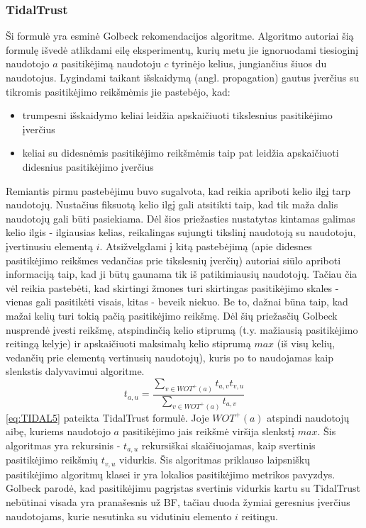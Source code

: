 \documentclass{VUMIFInfMagistrinis}
\begin{document}
\subsubsection{TidalTrust}
Ši formulė yra esminė Golbeck rekomendacijos algoritme. Algoritmo autoriai šią formulę išvedė atlikdami eilę eksperimentų, kurių metu jie ignoruodami tiesioginį naudotojo $a$ pasitikėjimą naudotoju $c$ tyrinėjo kelius, jungiančius šiuos du naudotojus. Lygindami taikant išskaidymą (angl. propagation) gautus įverčius su tikromis pasitikėjimo reikšmėmis jie pastebėjo, kad: 
\begin{itemize}
	\item trumpesni išskaidymo keliai leidžia apskaičiuoti tikslesnius pasitikėjimo įverčius
	\item keliai su didesnėmis pasitikėjimo reikšmėmis taip pat leidžia apskaičiuoti didesnius pasitikėjimo įverčius
\end{itemize}
Remiantis pirmu pastebėjimu buvo sugalvota, kad reikia apriboti kelio ilgį tarp naudotojų. Nustačius fiksuotą kelio ilgį gali atsitikti taip, kad tik maža dalis naudotojų gali būti pasiekiama. Dėl šios priežasties nustatytas kintamas galimas kelio ilgis - ilgiausias kelias, reikalingas sujungti tikslinį naudotoją su naudotoju, įvertinusiu elementą $i$.
\newline
\indent
Atsižvelgdami į kitą pastebėjimą (apie didesnes pasitikėjimo reikšmes vedančias prie tikslesnių įverčių) autoriai siūlo apriboti informaciją taip, kad ji būtų gaunama tik iš patikimiausių naudotojų. Tačiau čia vėl reikia pastebėti, kad skirtingi žmones turi skirtingas pasitikėjimo skales - vienas gali pasitikėti visais, kitas - beveik niekuo. Be to, dažnai būna taip, kad mažai kelių turi tokią pačią pasitikėjimo reikšmę. Dėl šių priežasčių Golbeck nusprendė įvesti reikšmę, atspindinčią kelio stiprumą (t.y. mažiausią pasitikėjimo reitingą kelyje) ir apskaičiuoti maksimalų kelio stiprumą $max$ (iš visų kelių, vedančių prie elementą vertinusių naudotojų), kuris po to naudojamas kaip slenkstis dalyvavimui algoritme.
\begin{equation}\label{eq:TIDAL5}
t_{a,u} = \frac{\sum\limits_{v \in WOT^{+}(a)}t_{a,v}t_{v,u}}{\sum\limits_{v \in WOT^{+}(a)}t_{a,v}}
\end{equation}
\eqref{eq:TIDAL5} pateikta TidalTrust formulė. Joje $WOT^{+}(a)$ atspindi naudotojų aibę, kuriems naudotojo $a$ pasitikėjimo jais reikšmė viršija slenkstį $max$.
\newline
\indent
Šis algoritmas yra rekursinis - $t_{a,u}$ rekursiškai skaičiuojamas, kaip svertinis pasitikėjimo reikšmių $t_{v,u}$ vidurkis. Šis algoritmas priklauso laipsniškų pasitikėjimo algoritmų klasei ir yra lokalios pasitikėjimo metrikos pavyzdys.
\newline
\indent
Golbeck parodė, kad pasitikėjimu pagrįstas svertinis vidurkis kartu su TidalTrust nebūtinai visada yra pranašesnis už BF, tačiau duoda žymiai geresnius įverčius naudotojams, kurie nesutinka su vidutiniu elemento $i$ reitingu.
\end{document}
